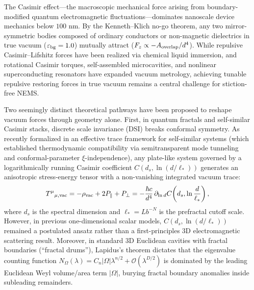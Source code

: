 \documentclass[11pt,letterpaper]{article}
\begin{document}
\vspace{1em}

The Casimir effect---the macroscopic mechanical force arising from boundary-modified quantum electromagnetic fluctuations\cite{casimir1948,bordag2009}---dominates nanoscale device mechanics below $100\text{ nm}$. By the Kenneth--Klich no-go theorem\cite{kennethklich2006}, any two mirror-symmetric bodies composed of ordinary conductors or non-magnetic dielectrics in true vacuum ($\varepsilon_{\rm bg}=1.0$) mutually attract ($F_z \propto -A_{\rm overlap}/d^4$). While repulsive Casimir--Lifshitz forces have been realized via chemical liquid immersion\cite{munday2009}, and rotational Casimir torques\cite{somers2018}, self-assembled microcavities\cite{munkhbat2021}, and nonlinear superconducting resonators\cite{casimir_drum2025,dejong2026} have expanded vacuum metrology, achieving tunable repulsive restoring forces in true vacuum remains a central challenge for stiction-free NEMS.

Two seemingly distinct theoretical pathways have been proposed to reshape vacuum forces through geometry alone. First, in quantum fractals\cite{kempkes2019,xu2021} and self-similar Casimir stacks\cite{akkermans2010,shajesh2016,shajesh2017}, discrete scale invariance (DSI) breaks conformal symmetry. As recently formalized in an effective trace framework for self-similar systems\cite{gordon2026prd} (which established thermodynamic compatibility via semitransparent mode tunneling and conformal-parameter $\xi$-independence\cite{milton2004,milton2016}), any plate-like system governed by a logarithmically running Casimir coefficient $C(d_s, \ln(d/\ell_*))$ generates an anisotropic stress-energy tensor with a non-vanishing integrated vacuum trace\cite{gordon2026prd}:
\begin{equation}
T^\mu{}_{\mu,\rm vac} = -\rho_{\rm vac} + 2P_\parallel + P_\perp = -\frac{\hbar c}{d^4} \,\partial_{\ln d}C\!\left(d_s, \ln\frac{d}{\ell_*}\right),
\label{eq:trace_running}
\end{equation}
where $d_s$ is the spectral dimension and $\ell_* = L b^{-N}$ is the prefractal cutoff scale. However, in previous one-dimensional scalar models\cite{gordon2026prd}, $C(d_s, \ln(d/\ell_*))$ remained a postulated ansatz rather than a first-principles 3D electromagnetic scattering result. Moreover, in standard 3D Euclidean cavities with fractal boundaries (``fractal drums''), Lapidus's theorem\cite{lapidus1991} dictates that the eigenvalue counting function $N_\Omega(\lambda) = C_n |\Omega|\lambda^{n/2} + \mathcal{O}(\lambda^{D/2})$ is dominated by the leading Euclidean Weyl volume/area term $|\Omega|$, burying fractal boundary anomalies inside subleading remainders.
\end{document}
